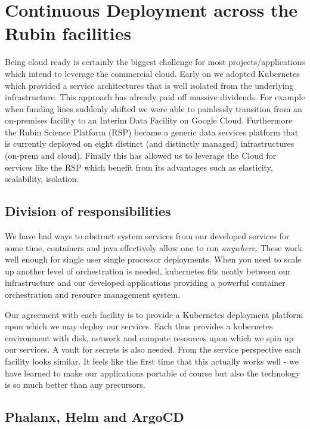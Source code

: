 \section{Continuous Deployment across the Rubin facilities} \label{sec:deploy}

Being cloud ready is certainly the biggest challenge for most projects/applications which intend to leverage the commercial cloud.
Early on we adopted Kubernetes which provided a service architectures that is well isolated from the underlying infrastructure.
This approach has already paid off massive dividends.
For example when funding lines suddenly shifted we were able to painlessly transition from an on-premises facility to an Interim Data Facility on Google Cloud.
Furthermore the Rubin Science Platform (RSP) became a generic data services platform that is currently deployed on eight distinct (and distinctly managed) infrastructures (on-prem and cloud).
Finally this has allowed us to leverage the Cloud for services like the RSP which benefit from its advantages such as elasticity, scalability, isolation.




\subsection{Division of responsibilities}
We have had ways to abstract system services from our developed services for some time, containers and java effectively allow one to run \emph{anywhere}.
These work well enough for single user single processor deployments.
When you need to scale up another level of orchestration is needed, kubernetes fits neatly between our infrastructure and our developed applications providing a powerful container orchestration and resource management system.

Our agreement with each facility is to provide a Kubernetes deployment platform upon which we may deploy our services.
Each thus provides a kubernetes environment with disk, network and compute resources upon which we spin up our services.
A vault for secrets is also needed.
From the service perspective each facility looks similar.
It feels like the first time that this actually works well - we have learned to make our applications portable of course but also the technology is so much better than any precursors.

\subsection{Phalanx, Helm and ArgoCD}

